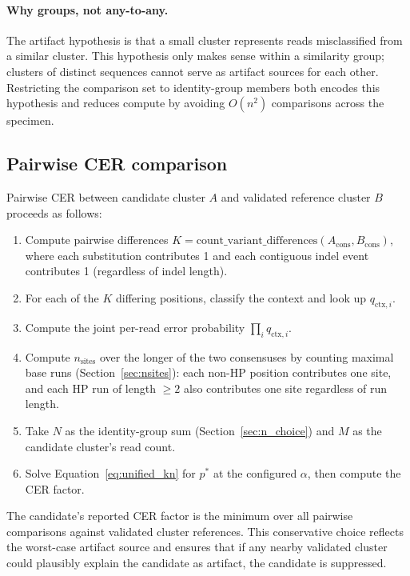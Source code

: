 \documentclass[11pt]{article}
\begin{document}
\paragraph{Why groups, not any-to-any.} The artifact hypothesis is that a
small cluster represents reads misclassified from a similar cluster. This
hypothesis only makes sense within a similarity group; clusters of distinct
sequences cannot serve as artifact sources for each other. Restricting the
comparison set to identity-group members both encodes this hypothesis and
reduces compute by avoiding $O(n^2)$ comparisons across the specimen.

\subsection{Pairwise CER comparison}
\label{sec:pairwise}

Pairwise CER between candidate cluster $A$ and validated reference cluster $B$
proceeds as follows:

\begin{enumerate}
\item Compute pairwise differences $K = \mathrm{count\_variant\_differences}(A_\text{cons}, B_\text{cons})$,
where each substitution contributes 1 and each contiguous indel event
contributes 1 (regardless of indel length).

\item For each of the $K$ differing positions, classify the context and look
up $q_{\text{ctx},i}$.

\item Compute the joint per-read error probability $\prod_i q_{\text{ctx},i}$.

\item Compute $n_\text{sites}$ over the longer of the two consensuses by
counting maximal base runs (Section~\ref{sec:nsites}): each non-HP position
contributes one site, and each HP run of length $\geq 2$ also contributes one
site regardless of run length.

\item Take $N$ as the identity-group sum (Section~\ref{sec:n_choice}) and $M$
as the candidate cluster's read count.

\item Solve Equation~\ref{eq:unified_kn} for $p^*$ at the configured $\alpha$,
then compute the CER factor.
\end{enumerate}

The candidate's reported CER factor is the minimum over all pairwise
comparisons against validated cluster references. This conservative choice
reflects the worst-case artifact source and ensures that if any nearby
validated cluster could plausibly explain the candidate as artifact, the
candidate is suppressed.
\end{document}
